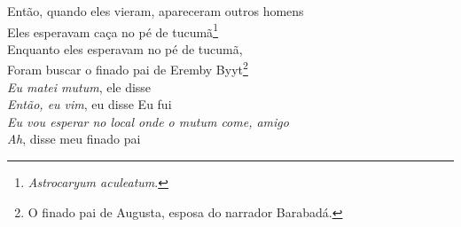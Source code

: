 \noindent   Então, quando eles vieram, apareceram outros homens\\
  Eles esperavam caça no pé de tucumã\footnote{\textit{Astrocaryum
   aculeatum}.}\\
  Enquanto eles esperavam no pé de tucumã,\\
  Foram buscar o finado pai de Eremby Byyt\footnote{O finado pai de
   Augusta, esposa do narrador Barabadá.}\\
  \textit{Eu matei mutum}, ele disse\\
  \textit{Então, eu vim}, eu disse
  Eu fui\\
  \textit{Eu vou esperar no local onde o mutum come, amigo}\\
  \textit{Ah}, disse meu finado pai
 
 \smallskip
 \begin{center}\end{center}
 \smallskip
 
